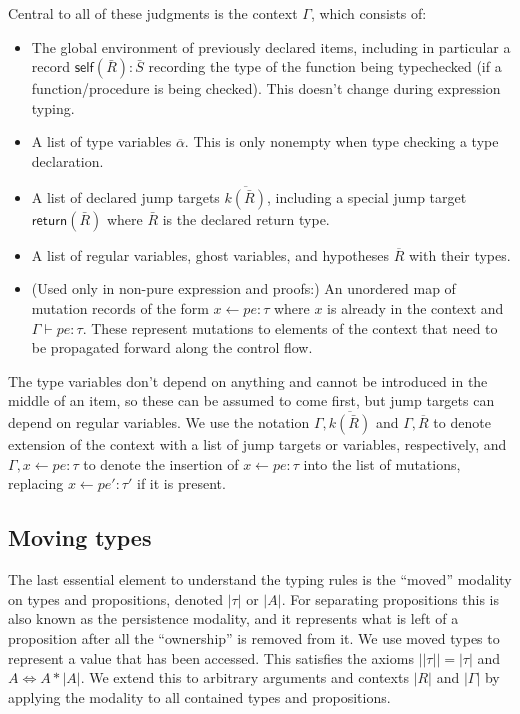 \documentclass[acmsmall,nonacm]{acmart}
\newcommand{\core}[1]{\left| #1 \right|}
\newcommand{\proves}{\vdash}
\begin{document}
Central to all of these judgments is the context $\Gamma$, which consists of:
\begin{itemize}
  \item The global environment of previously declared items, including in particular a record $\mathsf{self}(\bar R):\bar S$ recording the type of the function being typechecked (if a function/procedure is being checked). This doesn't change during expression typing.
  \item A list of type variables $\overline{\alpha}$. This is only nonempty when type checking a type declaration.
  \item A list of declared jump targets $\overline{k(\bar{R})}$, including a special jump target $\mathsf{return}(\bar{R})$ where $\bar{R}$ is the declared return type.
  \item A list of regular variables, ghost variables, and hypotheses $\overline{R}$ with their types.
  \item (Used only in non-pure expression and proofs:) An unordered map of mutation records of the form $x\gets pe:\tau$ where $x$ is already in the context and $\Gamma\proves pe:\tau$. These represent mutations to elements of the context that need to be propagated forward along the control flow.
\end{itemize}
The type variables don't depend on anything and cannot be introduced in the middle of an item, so these can be assumed to come first, but jump targets can depend on regular variables. We use the notation $\Gamma,\overline{k(\bar{R})}$ and $\Gamma,\overline{R}$ to denote extension of the context with a list of jump targets or variables, respectively, and $\Gamma,x\gets pe:\tau$ to denote the insertion of $x\gets pe:\tau$ into the list of mutations, replacing $x\gets pe':\tau'$ if it is present.

\subsection{Moving types}\label{sec:moving}

The last essential element to understand the typing rules is the ``moved'' modality on types and propositions, denoted $\core\tau$ or $\core A$. For separating propositions this is also known as the persistence modality, and it represents what is left of a proposition after all the ``ownership'' is removed from it. We use moved types to represent a value that has been accessed. This satisfies the axioms $\core{\core\tau}=\core\tau$ and $A\Leftrightarrow A\ast\core A$. We extend this to arbitrary arguments and contexts $\core R$ and $\core\Gamma$ by applying the modality to all contained types and propositions.
\end{document}

